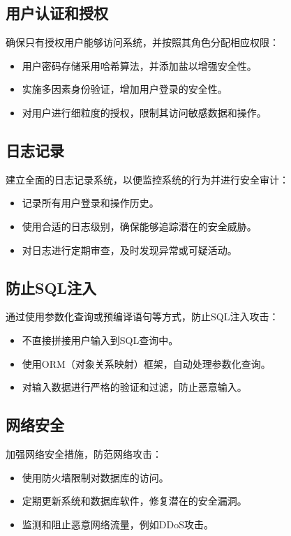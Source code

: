 \documentclass[11pt, a4paper, oneside]{ctexbook}
\begin{document}
\subsection{用户认证和授权}

确保只有授权用户能够访问系统，并按照其角色分配相应权限：

\begin{itemize}
  \item 用户密码存储采用哈希算法，并添加盐以增强安全性。
  \item 实施多因素身份验证，增加用户登录的安全性。
  \item 对用户进行细粒度的授权，限制其访问敏感数据和操作。
\end{itemize}

\subsection{日志记录}

建立全面的日志记录系统，以便监控系统的行为并进行安全审计：

\begin{itemize}
  \item 记录所有用户登录和操作历史。
  \item 使用合适的日志级别，确保能够追踪潜在的安全威胁。
  \item 对日志进行定期审查，及时发现异常或可疑活动。
\end{itemize}

\subsection{防止SQL注入}

通过使用参数化查询或预编译语句等方式，防止SQL注入攻击：

\begin{itemize}
  \item 不直接拼接用户输入到SQL查询中。
  \item 使用ORM（对象关系映射）框架，自动处理参数化查询。
  \item 对输入数据进行严格的验证和过滤，防止恶意输入。
\end{itemize}

\subsection{网络安全}

加强网络安全措施，防范网络攻击：

\begin{itemize}
  \item 使用防火墙限制对数据库的访问。
  \item 定期更新系统和数据库软件，修复潜在的安全漏洞。
  \item 监测和阻止恶意网络流量，例如DDoS攻击。
\end{itemize}
\end{document}
